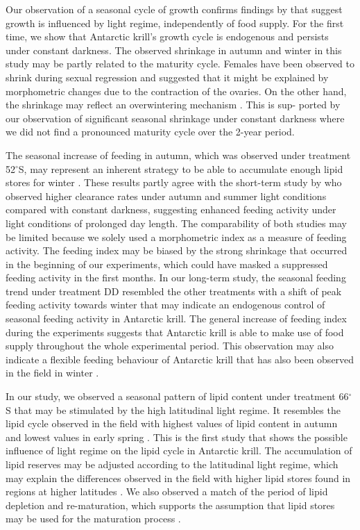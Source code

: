 Our observation of a seasonal cycle of growth confirms findings by
\citet{brown_temperature_2010} that suggest growth is influenced by light
regime, independently of food supply. For the first time, we show that
Antarctic krill’s growth cycle is endogenous and persists under constant
darkness. The observed shrinkage in autumn and winter in this study may be
partly related to the maturity cycle.  Females have been observed to shrink
during sexual regression \citep{thomas_thelycum_1987} and
\citet{tarling_growth_2016} suggested that it might be explained by
morphometric changes due to the contraction of the ovaries. On the other hand,
the shrinkage may reflect an overwintering mechanism
\citep{quetin_behavioral_1991}.  This is sup- ported by our observation of
significant seasonal shrinkage under constant darkness where we did not find a
pronounced maturity cycle over the 2-year period. 

The seasonal increase of feeding in autumn, which was observed under treatment
52$^{\circ}$S, may represent an inherent strategy to be able to accumulate
enough lipid stores for winter \citep{hagen_lipid_2001, meyer_seasonal_2010}.
These results partly agree with the short-term study by
\citet{teschke_simulated_2007} who observed higher clearance rates under autumn
and summer light conditions compared with constant darkness, suggesting
enhanced feeding activity under light conditions of prolonged day length. The
comparability of both studies may be limited because we solely used a
morphometric index as a measure of feeding activity. The feeding index may be
biased by the strong shrinkage that occurred in the beginning of our
experiments, which could have masked a suppressed feeding activity in the first
months. In our long-term study, the seasonal feeding trend under treatment DD
resembled the other treatments with a shift of peak feeding activity towards
winter that may indicate an endogenous control of seasonal feeding activity in
Antarctic krill. The general increase of feeding index during the experiments
suggests that Antarctic krill is able to make use of food supply throughout the
whole experimental period. This observation may also indicate a flexible
feeding behaviour of Antarctic krill \citep{atkinson_feeding_2002} that has
also been observed in the field in winter \citep{quetin_behavioral_1991,
huntley_elemental_1994, schmidt_feeding_2014}.

In our study, we observed a seasonal pattern of lipid content under treatment
66$^{\circ}$S that may be stimulated by the high latitudinal light regime. It
resembles the lipid cycle observed in the field with highest values of lipid
content in autumn and lowest values in early spring \citep{hagen_lipid_2001,
meyer_seasonal_2010}. This is the first study that shows the possible influence
of light regime on the lipid cycle in Antarctic krill. The accumulation of
lipid reserves may be adjusted according to the latitudinal light regime, which
may explain the differences observed in the field with higher lipid stores
found in regions at higher latitudes \citep{schmidt_feeding_2014}. We also
observed a match of the period of lipid depletion and re-maturation, which
supports the assumption that lipid stores may be used for the maturation
process \citep{teschke_effects_2008}.

